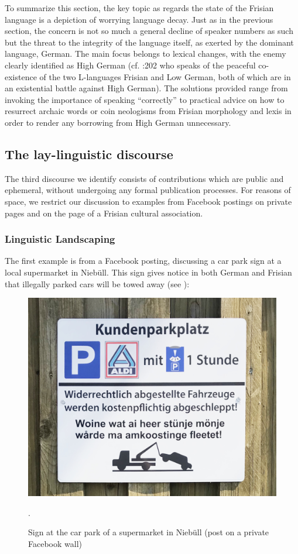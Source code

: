 \documentclass[output=paper]{langsci/langscibook}
\begin{document}
To summarize this section, the key topic as regards the state of the Frisian language is a depiction of worrying language decay. Just as in the previous section, the concern is not so much a general decline of speaker numbers as such but the threat to the integrity of the language itself, as exerted by the dominant language, German. The main focus belongs to lexical changes, with the enemy clearly identified as High German (cf. \citealt{Arhammar1973}:202 who speaks of the peaceful co-existence of the two L-languages Frisian and Low German, both of which are in an existential battle against High German). The solutions provided range from invoking the importance of speaking “correctly” to practical advice on how to resurrect archaic words or coin neologisms from Frisian morphology and lexis in order to render any borrowing from High German unnecessary.

\subsection{The lay-linguistic discourse}
\label{sec:gregersen:5.3}

The third discourse we identify consists of contributions which are public and ephemeral, without undergoing any formal publication processes. For reasons of space, we restrict our discussion to examples from Facebook postings on private pages and on the page of a Frisian cultural association. 

\subsubsection{Linguistic Landscaping}
\label{sec:gregersen:5.3.1}

The first example is from a Facebook posting, discussing a car park sign at a local supermarket in Niebüll. This sign gives notice in both German and Frisian that illegally parked cars will be towed away (see ):


\begin{figure}
\includegraphics[width=.75\textwidth]{figures/fig1_gregersen.jpg}
\caption{Sign at the car park of a supermarket in Niebüll (post on a private Facebook wall)}\label{fig:gregersen:1}.
\end{figure}
\end{document}
